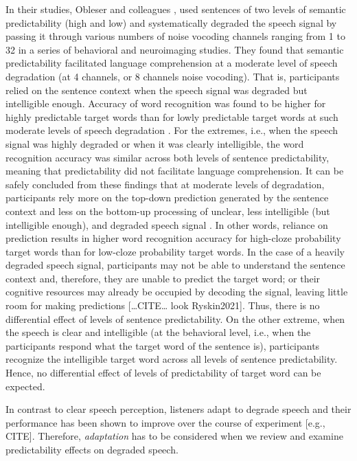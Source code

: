 \documentclass[a4paper, nobind]{templates/ociamthesis}
\begin{document}
In their studies, Obleser and colleagues \autocite{Obleser2007,Obleser2010,Obleser2011}, used sentences of two levels of semantic predictability (high and low) and systematically degraded the speech signal by passing it through various numbers of noise vocoding channels ranging from 1 to 32 in a series of behavioral and neuroimaging studies.
They found that semantic predictability facilitated language comprehension at a moderate level of speech degradation (at 4 channels, or 8 channels noise vocoding).
That is, participants relied on the sentence context when the speech signal was degraded but intelligible enough.
Accuracy of word recognition was found to be higher for highly predictable target words than for lowly predictable target words at such moderate levels of speech degradation \autocite{Obleser2010}.
For the extremes, i.e., when the speech signal was highly degraded or when it was clearly intelligible, the word recognition accuracy was similar across both levels of sentence predictability, meaning that predictability did not facilitate language comprehension.
It can be safely concluded from these findings that at moderate levels of degradation, participants rely more on the top-down prediction generated by the sentence context and less on the bottom-up processing of unclear, less intelligible (but intelligible enough), and degraded speech signal \autocite{Obleser2014}.
In other words, reliance on prediction results in higher word recognition accuracy for high-cloze probability target words than for low-cloze probability target words.
In the case of a heavily degraded speech signal, participants may not be able to understand the sentence context and, therefore, they are unable to predict the target word; or their cognitive resources may already be occupied by decoding the signal, leaving little room for making predictions {[}\ldots CITE\ldots{} look Ryskin2021{]}.
Thus, there is no differential effect of levels of sentence predictability.
On the other extreme, when the speech is clear and intelligible (at the behavioral level, i.e., when the participants respond what the target word of the sentence is), participants recognize the intelligible target word across all levels of sentence predictability.
Hence, no differential effect of levels of predictability of target word can be expected.

In contrast to clear speech perception, listeners adapt to degrade speech and their performance has been shown to improve over the course of experiment {[}e.g., CITE{]}.
Therefore, \emph{adaptation} has to be considered when we review and examine predictability effects on degraded speech.
\end{document}
